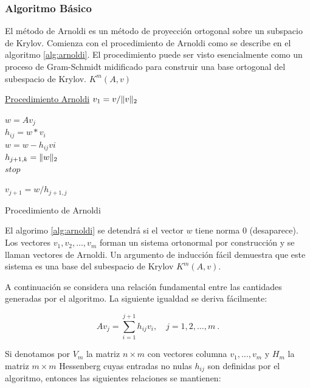 \documentclass[a4paper,openright,12pt, oneside]{book}
\DeclarePairedDelimiter\norm{\lVert}{\rVert}
\begin{document}
\subsubsection{Algoritmo B\'asico}
El m\'etodo de Arnoldi es un m\'etodo de proyecci\'on ortogonal sobre un subspacio de Krylov. Comienza con el procedimiento de Arnoldi como se describe en el algoritmo \ref{alg:arnoldi}. El procedimiento puede ser visto esencialmente como un proceso de Gram-Schmidt midificado para construir una base ortogonal del subespacio de Krylov. $\displaystyle K^{m}(A,v) $


\begin{algorithm}
    \label{alg:arnoldi}
    \underline{Procedimiento Arnoldi}\;
    ${v_{1}} = v/\norm{v}_{2} $\\

    {
      $w = Av_j$ \\
      { 
        $h_{ij} = w*v_i$\\
        $w = w - h_{ij}v{i}$\\
      }
      $h_{j+1, k} = \norm{w}_2$\\
       {
        $stop$
       }
      
      $v_{j+1} = w/h_{j+1, j}$\\
    }
    \caption{Procedimiento de Arnoldi}

\end{algorithm}

El algorimo \ref{alg:arnoldi} se detendr\'a si el vector $\displaystyle w$ tiene norma 0 (desaparece).  Los vectores $ v_1, v_2, \ldots, v_m $ forman un sistema ortonormal por construcci\'on y se llaman vectores de Arnoldi. Un argumento de inducci\'on f\'acil demuestra que este sistema es una base del subespacio de Krylov $K^m(A, v) $.

A continuaci\'on se considera una relaci\'on fundamental entre las cantidades generadas por el algoritmo. La siguiente igualdad se deriva f\'acilmente:

\begin{equation}
A v_j = \sum_{i=1}^{j+1} h_{ij} v_i , \quad j=1,2,\ldots ,m \ .
\end{equation}


Si denotamos por $ V_m $ la matriz $ n \times m $ con vectores columna $ v_1,
\ldots , v_m $ y $ H_m $ la matriz $ m \times m $ Hessenberg cuyas entradas no nulas $ h_{ij} $ son definidas por el algoritmo, entonces las siguientes relaciones se mantienen:
\end{document}
